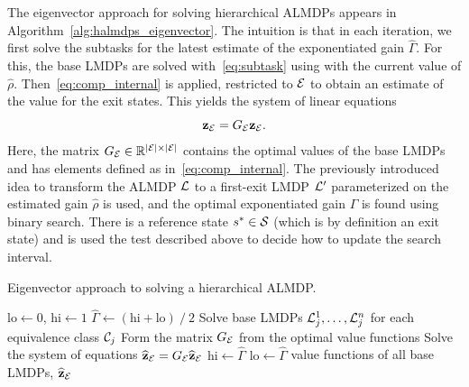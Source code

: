 The eigenvector approach for solving hierarchical ALMDPs appears in Algorithm~\ref{alg:halmdps_eigenvector}. The intuition is that in each iteration, we first solve the subtasks for the latest estimate of the exponentiated gain $\widehat\Gamma$. For this, the base LMDPs are solved with~\eqref{eq:subtask} using with the current value of $\widehat\rho$. Then~\eqref{eq:comp_internal} is applied, restricted to $\mathcal{E}$ to obtain an estimate of the value for the exit states. This yields the system of linear equations
\begin{equation}
    {\bf z_{\mathcal{E}}} = G_{\mathcal{E}} {\bf z_{\mathcal{E}}}.\label{eq:eigenvector}
\end{equation}
Here, the matrix $G_{\mathcal{E}}\in\mathbb{R}^{\lvert\mathcal{E}\rvert\times \lvert\mathcal{E}\rvert}$ contains the optimal values of the base LMDPs and has elements defined as in~\eqref{eq:comp_internal}. The previously introduced idea to transform the ALMDP $\mathcal{L}$ to a first-exit LMDP $\mathcal{L}'$ parameterized on the estimated gain $\widehat\rho$ is used, and  the optimal exponentiated gain $\Gamma$ is found using binary search. There is a reference state $s^*\in\mathcal{S}$ (which is by definition an exit state) and is used the test described above to decide how to update the search interval. 
\begin{algorithm}[!b]
  \caption{Eigenvector approach to solving a hierarchical ALMDP.}
  \begin{algorithmic}[1]

    \State $\text{lo}\gets 0$, $\text{hi}\gets 1$
    \State $\widehat\Gamma \gets (\text{hi} + \text{lo}) \mathbin{/} 2$
    \State Solve base LMDPs $\mathcal{L}_j^1,\ldots,\mathcal{L}_j^n$ for each equivalence class $\mathcal{C}_j$
    \State Form the matrix $G_{\mathcal{E}}$ from the optimal value functions
    \State Solve the system of equations  ${\bf \widehat z_{\mathcal{E}}} = G_{\mathcal{E}} {\bf\widehat z_{\mathcal{E}}}$
    \State $\text{hi}\gets \widehat\Gamma$
    \Else \State $\text{lo}\gets \widehat\Gamma$
    \EndIf
    \vspace*{3pt}
    \EndWhile
    \State \Return value functions of all base LMDPs, ${\bf \widehat z_{\mathcal{E}}}$
  \end{algorithmic}
  \label{alg:halmdps_eigenvector}
\end{algorithm}

